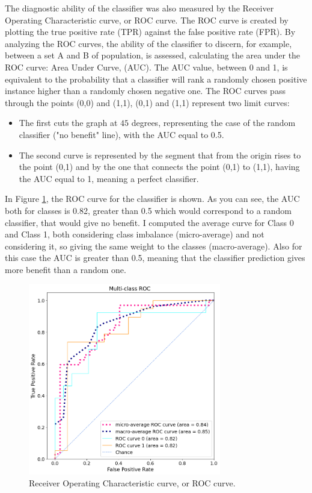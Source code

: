 \documentclass{standalone}
\begin{document}
The diagnostic ability of the classifier was also measured by the Receiver Operating Characteristic curve, or ROC curve.
The ROC curve is created by plotting the true positive rate (TPR) against the false positive rate (FPR).
By analyzing the ROC curves, the ability of the classifier to discern, for example, between a set A and B of population, is assessed, calculating the area under the ROC curve: Area Under Curve, (AUC). 
The AUC value, between 0 and 1, is equivalent to the probability that a classifier will rank a randomly chosen positive instance higher than a randomly chosen negative one.
The ROC curves pass through the points (0,0) and (1,1), (0,1) and (1,1) represent two limit curves:
\begin{itemize}
    \item The first cuts the graph at $45$ degrees, representing the case of the random classifier ("no benefit" line), with the AUC equal to 0.5.
    \item The second curve is represented by the segment that from the origin rises to the point (0,1) and by the one that connects the point (0,1) to (1,1), having the AUC equal to 1, meaning a perfect classifier.
\end{itemize}
In Figure \ref{ROC}, the ROC curve for the classifier is shown.
As you can see, the AUC both for classes is 0.82, greater than 0.5 which would correspond to a random classifier, that would give no benefit. 
I computed the average curve for Class 0 and Class 1, both considering class imbalance (micro-average) and not considering it, so giving the same weight to the classes (macro-average). 
Also for this case the AUC is greater than 0.5, meaning that the classifier prediction gives more benefit than a random one.

\begin{figure}[htp]

    \centering
    \includegraphics[width=0.75\textwidth]{../images/ROC.png}

    \caption{Receiver Operating Characteristic curve, or ROC curve.}
    \label{ROC}
    
\end{figure}
\end{document}
